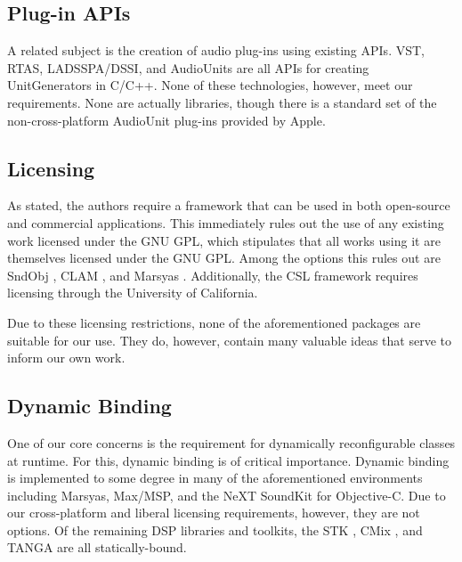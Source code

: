 \documentclass[twoside,10pt]{article}
\begin{document}
\subsection{Plug-in APIs} %

A related subject is the creation of audio plug-ins using existing APIs.  VST, RTAS, LADSSPA/DSSI, and AudioUnits are all APIs for creating UnitGenerators in C/C++.  None of these technologies, however, meet our requirements.  None are actually libraries, though there is a standard set of the non-cross-platform AudioUnit plug-ins provided by Apple.



\subsection{Licensing} %

As stated, the authors require a framework that can be used in both open-source and commercial applications.  This immediately rules out the use of any existing work licensed under the GNU GPL, which stipulates that all works using it are themselves licensed under the GNU GPL.  Among the options this rules out are SndObj \cite{Lazzarini:2001}, CLAM \cite{Amatraian:2008}, and Marsyas \cite{Tzanetakis:2008}.  Additionally, the CSL framework \cite{Pope:2003} requires licensing through the University of California.%

Due to these licensing restrictions, none of the aforementioned packages are suitable for our use.
They do, however, contain many valuable ideas that serve to inform our own work.



\subsection{Dynamic Binding} %

One of our core concerns is the requirement for dynamically reconfigurable classes at runtime.  For this, dynamic binding is of critical importance.  Dynamic binding is implemented to some degree in many of the aforementioned environments including Marsyas, Max/MSP, and the NeXT SoundKit for Objective-C.  Due to our cross-platform and liberal licensing requirements, however, they are not options.  Of the remaining DSP libraries and toolkits, the STK \cite{Cook:1999}, CMix \cite{Lansky:1990}, and TANGA \cite{Reiter:2007} are all statically-bound.  
\end{document}
